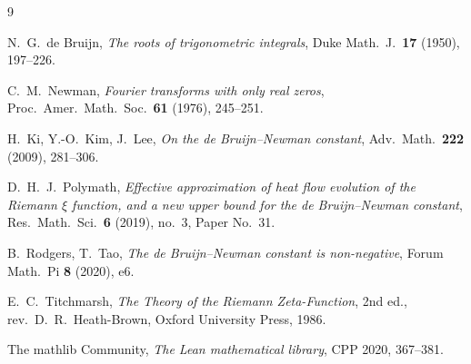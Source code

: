 \documentclass[11pt]{article}
\theoremstyle{definition}
\begin{document}
\begin{thebibliography}{9}

N.~G.~de Bruijn,
\emph{The roots of trigonometric integrals},
Duke Math.\ J.\ \textbf{17} (1950), 197--226.

C.~M.~Newman,
\emph{Fourier transforms with only real zeros},
Proc.\ Amer.\ Math.\ Soc.\ \textbf{61} (1976), 245--251.

H.~Ki, Y.-O.~Kim, J.~Lee,
\emph{On the de Bruijn--Newman constant},
Adv.\ Math.\ \textbf{222} (2009), 281--306.

D.~H.~J.~Polymath,
\emph{Effective approximation of heat flow evolution of the Riemann $\xi$ function, and a new upper
bound for the de Bruijn--Newman constant},
Res.\ Math.\ Sci.\ \textbf{6} (2019), no.~3, Paper No.~31.

B.~Rodgers, T.~Tao,
\emph{The de Bruijn--Newman constant is non-negative},
Forum Math.\ Pi \textbf{8} (2020), e6.

E.~C.~Titchmarsh,
\emph{The Theory of the Riemann Zeta-Function}, 2nd ed., rev.\ D.~R.~Heath-Brown,
Oxford University Press, 1986.

The mathlib Community,
\emph{The Lean mathematical library},
CPP 2020, 367--381.

\end{thebibliography}
\end{document}
